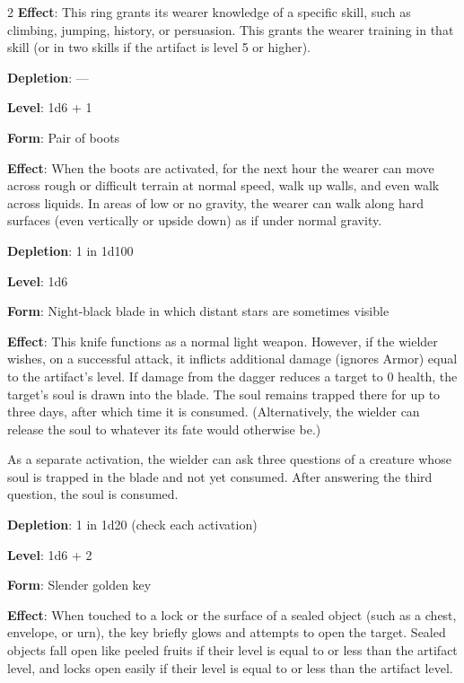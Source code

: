 \begin{multicols}{2}
\textbf{Effect}: This ring grants its wearer knowledge of a specific skill, such as climbing, jumping, history, or persuasion. This grants the wearer training in that skill (or in two skills if the artifact is level 5 or higher). 

\textbf{Depletion}: — 


\textbf{Level}: 1d6 + 1 

\textbf{Form}: Pair of boots 

\textbf{Effect}: When the boots are activated, for the next hour the wearer can move across rough or difficult terrain at normal speed, walk up walls, and even walk across liquids. In areas of low or no gravity, the wearer can walk along hard surfaces (even vertically or upside down) as if under normal gravity. 

\textbf{Depletion}: 1 in 1d100 


\textbf{Level}: 1d6 

\textbf{Form}: Night-black blade in which distant stars are sometimes visible 

\textbf{Effect}: This knife functions as a normal light weapon. However, if the wielder wishes, on a successful attack, it inflicts additional damage (ignores Armor) equal to the artifact’s level. If damage from the dagger reduces a target to 0 health, the target’s soul is drawn into the blade. The soul remains trapped there for up to three days, after which time it is consumed. (Alternatively, the wielder can release the soul to whatever its fate would otherwise be.) 

As a separate activation, the wielder can ask three questions of a creature whose soul is trapped in the blade and not yet consumed. After answering the third question, the soul is consumed. 

\textbf{Depletion}: 1 in 1d20 (check each activation)


\textbf{Level}: 1d6 + 2 

\textbf{Form}: Slender golden key 

\textbf{Effect}: When touched to a lock or the surface of a sealed object (such as a chest, envelope, or urn), the key briefly glows and attempts to open the target. Sealed objects fall open like peeled fruits if their level is equal to or less than the artifact level, and locks open easily if their level is equal to or less than the artifact level. 


\end{multicols}
